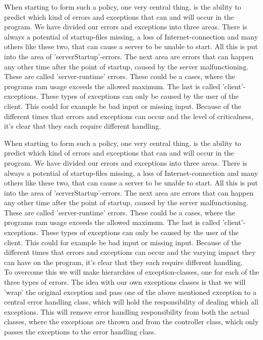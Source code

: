 \documentclass[a4paper,10pt,titlepage]{article}
\begin{document}
When starting to form such a policy, one very central thing, is the ability to predict which kind of errors and exceptions that can and will occur in the program. We have divided our errors and exceptions into three areas. There is always a potential of startup-files missing, a loss of Internet-connection and many others like these two, that can cause a server to be unable to start. All this is put into the area of 'serverStartup'-errors. The next area are errors that can happen any other time after the point of startup, caused by the server malfunctioning. These are called 'server-runtime' errors. These could be a cases, where the programs ram usage exceeds the allowed maximum. The last is called 'client'-exceptions. These types of exceptions can only be caused by the user of the client. This could for example be bad input or missing input.  Because of the different times that errors and exceptions can occur and the level of criticalness, it's clear that they each require different handling.

	 When starting to form such a policy, one very central thing, is the ability to predict which kind of errors and exceptions that can and will occur in the program. We have divided our errors and exceptions into three areas. There is always a potential of startup-files missing, a loss of Internet-connection and many others like these two, that can cause a server to be unable to start. All this is put into the area of 'serverStartup'-errors. The next area are errors that can happen any other time after the point of startup, caused by the server malfunctioning. These are called 'server-runtime' errors. These could be a cases, where the programs ram usage exceeds the allowed maximum. The last is called 'client'-exceptions. These types of exceptions can only be caused by the user of the client. This could for example be bad input or missing input.  Because of the different times that errors and exceptions can occur and the varying impact they can have on the program, it's clear that they each require different handling. \\

To overcome this we will make hierarchies of exception-classes, one for each of the three types of errors. The idea with our own exceptions classes is that we will 'wrap' the original exception and pass one of the above mentioned exception to a central error handling class, which will hold the responsibility of dealing which all exceptions. This will remove error handling responsibility from both the actual classes, where the exceptions are thrown and from the controller class, which only passes the exceptions to the error handling class.
\end{document}
